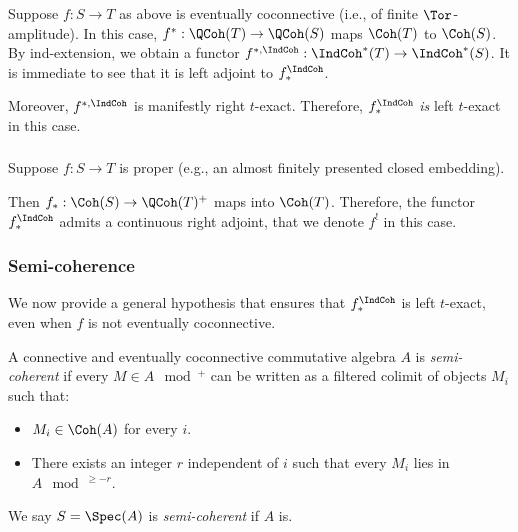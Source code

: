 \subsubsection{}

Suppose $f:S \to T$ as above is eventually coconnective (i.e., of finite
$\Tor$-amplitude). In this case,
$f^*:\QCoh(T) \to \QCoh(S)$ maps $\Coh(T)$ to $\Coh(S)$. By ind-extension,
we obtain a functor $f^{*,\IndCoh}:\IndCoh^*(T) \to \IndCoh^*(S)$.
It is immediate to see that it is left adjoint to $f_*^{\IndCoh}$.

Moreover, $f^{*,\IndCoh}$ is manifestly right $t$-exact. Therefore,
$f_*^{\IndCoh}$ \emph{is} left $t$-exact in this case.

\subsubsection{}

Suppose $f:S \to T$ is proper (e.g., an almost finitely presented
closed embedding).

Then $f_*:\Coh(S) \to \QCoh(T)^+$ maps into $\Coh(T)$. Therefore,
the functor $f_*^{\IndCoh}$ admits a continuous right adjoint,
that we denote $f^!$ in this case.

\subsubsection{Semi-coherence}

We now provide a general hypothesis that ensures that $f_*^{\IndCoh}$ is
left $t$-exact, even when $f$ is not eventually coconnective.

\begin{defin}
\notready

A connective and eventually coconnective
commutative algebra $A$ is \emph{semi-coherent}
if every $M \in A\mod^+$ can be written as a filtered colimit
of objects $M_i$ such that:

\begin{itemize}

\item $M_i \in \Coh(A)$ %
for every $i$.

\item There exists an integer $r$ independent of $i$
such that every $M_i$ lies in $A\mod^{\geq -r}$.

\end{itemize}

We say $S = \Spec(A)$ is \emph{semi-coherent} if $A$ is.

\end{defin}

